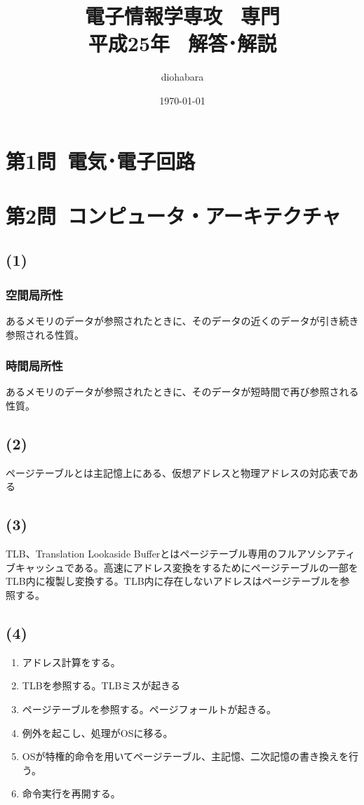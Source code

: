 \documentclass[a4paper,12pt,xelatex,ja=standard]{bxjsarticle}
\title{電子情報学専攻 \, 専門 \\ 平成25年 \, 解答･解説}
\author{diohabara}
\date{\today}
\begin{document}
\maketitle

\section*{第1問\ 電気･電子回路}

\section*{第2問\ コンピュータ・アーキテクチャ}
  \subsection*{(1)}
    \subsubsection*{空間局所性}
    あるメモリのデータが参照されたときに、そのデータの近くのデータが引き続き参照される性質。
    \subsubsection*{時間局所性}
    あるメモリのデータが参照されたときに、そのデータが短時間で再び参照される性質。

  \subsection*{(2)}
  ページテーブルとは主記憶上にある、仮想アドレスと物理アドレスの対応表である

  \subsection*{(3)}
  TLB、Translation Lookaside Bufferとはページテーブル専用のフルアソシアティブキャッシュである。高速にアドレス変換をするためにページテーブルの一部をTLB内に複製し変換する。TLB内に存在しないアドレスはページテーブルを参照する。

  \subsection*{(4)}
  \begin{enumerate}
    \item アドレス計算をする。
    \item TLBを参照する。TLBミスが起きる
    \item ページテーブルを参照する。ページフォールトが起きる。
    \item 例外を起こし、処理がOSに移る。
    \item OSが特権的命令を用いてページテーブル、主記憶、二次記憶の書き換えを行う。
    \item 命令実行を再開する。
  \end{enumerate}
\end{document}
